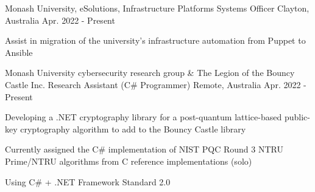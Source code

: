 

\begin{cventries}

  \cventry
  {Monash University, eSolutions, Infrastructure Platforms} %
  {Systems Officer} %
  {Clayton, Australia} %
  {Apr. 2022 - Present} %
  {
    \begin{cvitems} %
      \item {Assist in migration of the university's infrastructure automation from Puppet to Ansible}
    \end{cvitems}
  }

  \cventry
    {Monash University cybersecurity research group \& The Legion of the Bouncy Castle Inc.} %
    {Research Assistant (C\# Programmer)} %
    {Remote, Australia} %
    {Apr. 2022 - Present} %
    {
      \begin{cvitems} %
        \item {Developing a .NET cryptography library for a post-quantum lattice-based public-key cryptography algorithm to add to the Bouncy Castle library}
        \item {Currently assigned the C\# implementation of NIST PQC Round 3 NTRU Prime/NTRU algorithms from C reference implementations (solo)}
        \item {Using C\# + .NET Framework Standard 2.0}
      \end{cvitems}
    }


\end{cventries}
